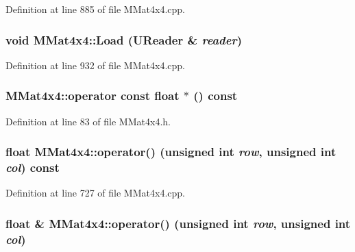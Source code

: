 Definition at line 885 of file MMat4x4.cpp.\hypertarget{class_m_mat4x4_3ca6c5ddab80f8b7eb30ec47f4f908c9}{
\subsubsection[{Load}]{\setlength{\rightskip}{0pt plus 5cm}void MMat4x4::Load ({\bf UReader} \& {\em reader})}}
\label{class_m_mat4x4_3ca6c5ddab80f8b7eb30ec47f4f908c9}




Definition at line 932 of file MMat4x4.cpp.\hypertarget{class_m_mat4x4_efc2d783f3d6384b87d7b8e3705b8e5f}{
\subsubsection[{operator const float $\ast$}]{\setlength{\rightskip}{0pt plus 5cm}MMat4x4::operator const float $\ast$ () const}}
\label{class_m_mat4x4_efc2d783f3d6384b87d7b8e3705b8e5f}




Definition at line 83 of file MMat4x4.h.\hypertarget{class_m_mat4x4_e3f4c44e37d6715708f5ee7397d8f9b3}{
\subsubsection[{operator()}]{\setlength{\rightskip}{0pt plus 5cm}float MMat4x4::operator() (unsigned int {\em row}, \/  unsigned int {\em col}) const}}
\label{class_m_mat4x4_e3f4c44e37d6715708f5ee7397d8f9b3}




Definition at line 727 of file MMat4x4.cpp.\hypertarget{class_m_mat4x4_c636eaea929506f008eed9bff65c3aca}{
\subsubsection[{operator()}]{\setlength{\rightskip}{0pt plus 5cm}float \& MMat4x4::operator() (unsigned int {\em row}, \/  unsigned int {\em col})}}
\label{class_m_mat4x4_c636eaea929506f008eed9bff65c3aca}




